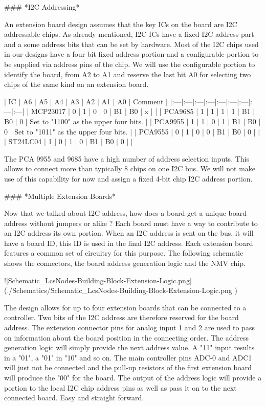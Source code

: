 ### *I2C Addressing*

An extension board design assumes that the key ICs on the board are I2C addressable chips. As already mentioned, I2C ICs have a fixed I2C address part and a some address bits that can be set by hardware. Most of the I2C chips used in our designs have a four bit fixed address portion and a configurable portion to be supplied via address pins of the chip. We will use the configurable portion to identify the board, from A2 to A1 and reserve the last bit A0 for selecting two chips of the same kind on an extension board.

| IC | A6 | A5 | A4 | A3 | A2 | A1 | A0 | Comment |
|:---|:---|:---|:---|:---|:---|:---|:---|:---|
| MCP23017 | 0 | 1 | 0 | 0 | B1 | B0 | x | |
| PCA9685  | 1 | 1 | 1 | 1 | B1 | B0 | 0 | Set to "1100" as the upper four bits. |
| PCA9955  | 1 | 1 | 0 | 1 | B1 | B0 | 0 | Set to "1011" as the upper four bits. |
| PCA9555  | 0 | 1 | 0 | 0 | B1 | B0 | 0 | |
| ST24LC04 | 1 | 0 | 1 | 0 | B1 | B0 | 0 | |

The PCA 9955 and 9685 have a high number of address selection inputs. This allows to connect more than typically 8 chips on one I2C bus. We will not make use of this capability for now and assign a fixed 4-bit chip I2C address portion.

### *Multiple Extension Boards*

Now that we talked about I2C address, how does a board get a unique board address without jumpers or alike ? Each board must have a way to contribute to an I2C address its own portion. When an I2C address is sent on the bus, it will have a board ID, this ID is used in the final I2C address. Each extension board features a common set of circuitry for this purpose. The following schematic shows the connectors, the board address generation logic and the NMV chip.

![Schematic_LcsNodes-Building-Block-Extension-Logic.png](./Schematics/Schematic_LcsNodes-Building-Block-Extension-Logic.png )

The design allows for up to four extension boards that can be connected to a controller. Two bits of the I2C address are therefore reserved for the board address. The extension connector pins for analog input 1 and 2 are used to pass on information about the board position in the connecting order. The address generation logic will simply provide the next address value. A "11" input results in a "01", a "01" in "10" and so on. The main controller pins ADC-0 and ADC1 will just not be connected and the pull-up resistors of the first extension board will produce the "00" for the board. The output of the address logic will provide a portion to the  local I2C chip address pins as well as pass it on to the next connected board. Easy and straight forward.

